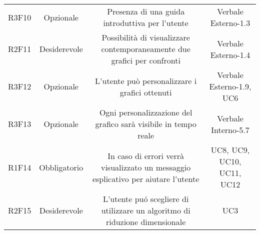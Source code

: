 \begin{center}
\begin{longtable}{C{\colA} C{\colB} C{\colC} C{\colA}}
R3F10 & Opzionale & Presenza di una guida introduttiva per l'utente & Verbale Esterno-1.3\\
R2F11 & Desiderevole & Possibilità di visualizzare contemporaneamente due grafici per confronti & Verbale Esterno-1.4\\
R3F12 & Opzionale & L'utente può personalizzare i grafici ottenuti & Verbale Esterno-1.9, UC6 \\
R3F13 & Opzionale & Ogni personalizzazione del grafico sarà visibile in tempo reale & Verbale Interno-5.7 \\
R1F14 & Obbligatorio & In caso di errori verrà visualizzato un messaggio esplicativo per aiutare l'utente & UC8, UC9, UC10, UC11, UC12\\
R2F15 & Desiderevole & L'utente puó scegliere di utilizzare un algoritmo di riduzione dimensionale & UC3 \\ 

\end{longtable}
\end{center}



